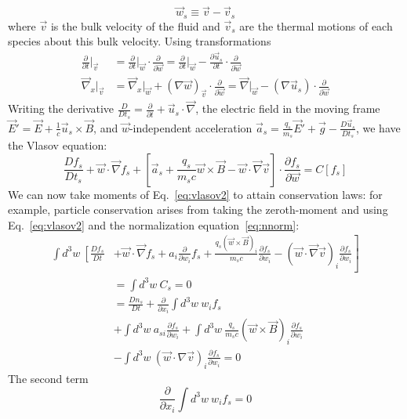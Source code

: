 \begin{equation}
  \vec w_s\equiv\vec v-\vec v_s
\end{equation}
where $\vec v$ is the bulk velocity of the fluid and $\vec v_s$ are the thermal motions of each species about this bulk velocity.
Using transformations
\begin{align*}
  \frac{\partial}{\partial t}\vert_{\vec v}&=\frac{\partial}{\partial t}\vert_{\vec w}\cdot\frac{\partial}{\partial \vec w}=\frac{\partial}{\partial t}\vert_{\vec w}-\frac{\partial\vec u_s}{\partial t}\cdot\frac\partial{\partial\vec w}\\
  \vec\nabla_x\vert_{\vec v}&=\vec\nabla_x\vert_{\vec w}+(\nabla\vec w)_{\vec v}\cdot\frac{\partial}{\partial\vec w}=\vec\nabla\vert_{\vec w}-(\nabla\vec u_s)\cdot\frac{\partial}{\partial\vec w}
\end{align*}
Writing the derivative $\frac{D}{Dt_s}=\frac{\partial}{\partial t}+\vec u_s\cdot\vec\nabla$, the electric field in the moving frame $\vec E'=\vec E+\frac1c\vec u_s\times\vec B$, and $\vec w$-independent acceleration $\vec a_s=\frac{q_s}{m_s}\vec E'+\vec g-\frac{D\vec u_s}{Dt_s}$, we have the Vlasov equation:
\begin{equation}
  \frac{Df_s}{Dt_s}+\vec w\cdot\vec\nabla f_s+\left[\vec a_s+\frac{q_s}{m_sc}\vec w\times\vec B-\vec w\cdot\vec\nabla\vec v\right]\cdot\frac{\partial f_s}{\partial\vec w}=C[f_s]\label{eq:vlasov2}
\end{equation}
We can now take moments of Eq.~\ref{eq:vlasov2} to attain conservation laws: for example, particle conservation arises from taking the zeroth-moment and using Eq.~\ref{eq:vlasov2} and the normalization equation~\ref{eq:nnorm}:
\begin{align*}
  \int d^3w~\left[\frac{Df_s}{Dt}\right.&\left.+\vec w\cdot \vec\nabla f_s+a_i\frac{\partial}{\partial w_i} f_s+\frac{q_s(\vec w\times\vec B)_i}{m_sc}\frac{\partial f_s}{\partial w_i}-(\vec w\cdot\vec\nabla\vec v)_i\frac{\partial f_s}{\partial w_i} \right]\\
  &=\int d^3w~C_s=0\\
  &=\frac{Dn_s}{Dt}+\frac{\partial}{\partial x_i}\int d^3w~w_if_s\\
  &+\int d^3w~a_{si}\frac{\partial f_s}{\partial w_i}+\int d^3w~\frac{q_s}{m_sc}(\vec w\times\vec B)_i\frac{\partial f_s}{\partial w_i}\\
  &-\int d^3w~(\vec w\cdot\nabla\vec v)_i\frac{\partial f_s}{\partial w_i}=0
\end{align*}
The second term
\begin{equation*}
  \frac{\partial}{\partial x_i}\int d^3w~w_if_s=0
\end{equation*}
